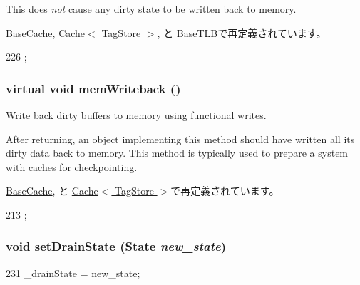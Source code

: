 This does {\itshape not\/} cause any dirty state to be written back to memory. 

\hyperlink{classBaseCache_aeb9356f940fbf8410f41920ee1d5864d}{BaseCache}, \hyperlink{classCache_afea64b0aa579c17485db54c6a5c2ede3}{Cache$<$ TagStore $>$}, と \hyperlink{classBaseTLB_afea64b0aa579c17485db54c6a5c2ede3}{BaseTLB}で再定義されています。


\begin{DoxyCode}
226 {};
\end{DoxyCode}
\hypertarget{classDrainable_aaec8b1741246cef384bc2743ce21cc34}{
\subsubsection[{memWriteback}]{\setlength{\rightskip}{0pt plus 5cm}virtual void memWriteback ()}}
\label{classDrainable_aaec8b1741246cef384bc2743ce21cc34}
Write back dirty buffers to memory using functional writes.

After returning, an object implementing this method should have written all its dirty data back to memory. This method is typically used to prepare a system with caches for checkpointing. 

\hyperlink{classBaseCache_afd3c83f1883488031612de6c47fcaabb}{BaseCache}, と \hyperlink{classCache_a381272ae5c2cc173adb59cd67a76b458}{Cache$<$ TagStore $>$}で再定義されています。


\begin{DoxyCode}
213 {};
\end{DoxyCode}
\hypertarget{classDrainable_ad800905390fe03e850cf996e914038f9}{
\subsubsection[{setDrainState}]{\setlength{\rightskip}{0pt plus 5cm}void setDrainState ({\bf State} {\em new\_\-state})}}
\label{classDrainable_ad800905390fe03e850cf996e914038f9}



\begin{DoxyCode}
231 { _drainState = new_state; }
\end{DoxyCode}


